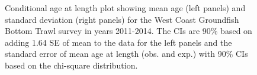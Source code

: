 \documentclass[
]{scrartcl}
\begin{document}
\begin{figure}[H]


\caption{\label{fig-call-plot-wcgbts3}Conditional age at length plot
showing mean age (left panels) and standard deviation (right panels) for
the West Coast Groundfish Bottom Trawl survey in years 2011-2014. The
CIs are 90\% based on adding 1.64 SE of mean to the data for the left
panels and the standard error of mean age at length (obs. and exp.) with
90\% CIs based on the chi-square distribution.}

\end{figure}%
\end{document}
